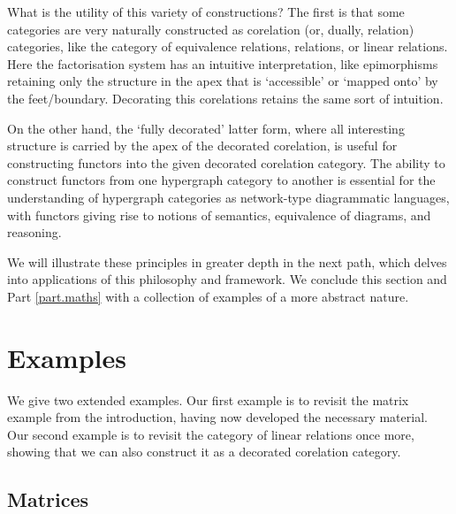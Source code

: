 What is the utility of this variety of constructions? The first is that some
categories are very naturally constructed as corelation (or, dually, relation)
categories, like the category of equivalence relations, relations, or linear
relations. Here the factorisation system has an intuitive interpretation, like
epimorphisms retaining only the structure in the apex that is `accessible' or
`mapped onto' by the feet/boundary. Decorating this corelations retains the same
sort of intuition.

On the other hand, the `fully decorated' latter form, where all interesting
structure is carried by the apex of the decorated corelation, is useful for
constructing functors into the given decorated corelation category. The ability
to construct functors from one hypergraph category to another is essential for
the understanding of hypergraph categories as network-type diagrammatic
languages, with functors giving rise to notions of semantics, equivalence of
diagrams, and reasoning.

We will illustrate these principles in greater depth in the next path, which
delves into applications of this philosophy and framework. We conclude this
section and Part \ref{part.maths} with a collection of examples of a more
abstract nature.



\section{Examples} \label{sec:excor}
We give two extended examples. Our first example is to revisit the matrix
example from the introduction, having now developed the necessary material. Our
second example is to revisit the category of linear relations once more, showing
that we can also construct it as a decorated corelation category. 

\subsection{Matrices} \label{ssec.matrices}

